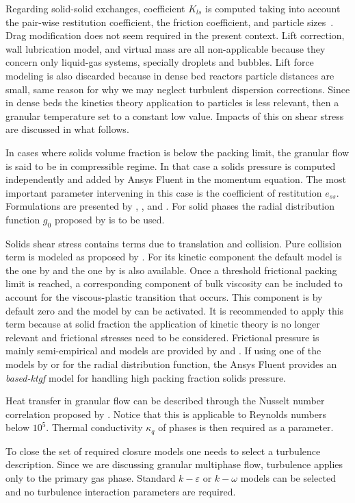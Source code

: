 Regarding solid-solid exchanges, coefficient $K_{ls}$ is computed taking into account the pair-wise restitution coefficient, the friction coefficient, and particle sizes~\cite{Syamlal1987b}. Drag modification does not seem required in the present context. Lift correction, wall lubrication model, and virtual mass are all non-applicable because they concern only liquid-gas systems, specially droplets and bubbles. Lift force modeling is also discarded because in dense bed reactors particle distances are small, same reason for why we may neglect turbulent dispersion corrections. Since in dense beds the kinetics theory application to particles is less relevant, then a granular temperature set to a constant low value. Impacts of this on shear stress are discussed in what follows.

In cases where solids volume fraction is below the packing limit, the granular flow is said to be in compressible regime. In that case a solids pressure is computed independently and added by Ansys Fluent in the momentum equation. The most important parameter intervening in this case is the coefficient of restitution $e_{ss}$. Formulations are presented by \textcite{Gidaspow1994}, \textcite{Syamlal1993}, and \textcite{Ahmadi1990}. For solid phases the radial distribution function $g_{0}$ proposed by \textcite{Gidaspow1994} is to be used.

Solids shear stress contains terms due to translation and collision. Pure collision term is modeled as proposed by \textcite{Gidaspow1992}. For its kinetic component the default model is the one by \textcite{Syamlal1993} and the one by \textcite{Gidaspow1992} is also available.  Once a threshold frictional packing limit is reached, a corresponding component of bulk viscosity can be included to account for the viscous-plastic transition that occurs. This component is by default zero and the model by \textcite{Lun1984} can be activated. It is recommended to apply this term because at solid fraction the application of kinetic theory is no longer relevant and frictional stresses need to be considered. Frictional pressure is mainly semi-empirical and models are provided by \textcite{Johnson1987} and \textcite{Syamlal1993}. If using one of the models by \textcite{Lun1984} or \textcite{Gidaspow1992} for the radial distribution function, the Ansys Fluent provides an \emph{based-ktgf} model for handling high packing fraction solids pressure.
 
Heat transfer in granular flow can be described through the Nusselt number correlation proposed by \textcite{Gunn1978}. Notice that this is applicable to Reynolds numbers below $10^5$. Thermal conductivity $\kappa_q$ of phases is then required as a parameter.

To close the set of required closure models one needs to select a turbulence description. Since we are discussing granular multiphase flow, turbulence applies only to the primary gas phase. Standard $k-\varepsilon$ or $k-\omega$ models can be selected and no turbulence interaction parameters are required.

\endinput